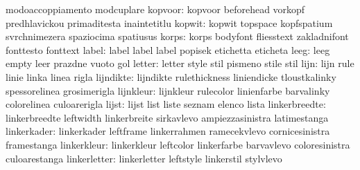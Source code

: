                            modoaccoppiamento         modcuplare
                  kopvoor: kopvoor                   beforehead
                           vorkopf                   predhlavickou
                           primaditesta              inaintetitlu
                   kopwit: kopwit                    topspace
                           kopfspatium               svrchnimezera
                           spaziocima                spatiusus
                    korps: korps                     bodyfont
                           fliesstext                zakladnifont
                           fonttesto                 fonttext
                    label: label                     label
                           label                     popisek
                           etichetta                 eticheta
                     leeg: leeg                      empty
                           leer                      prazdne
                           vuoto                     gol
                   letter: letter                    style
                           stil                      pismeno
                           stile                     stil
                     lijn: lijn                      rule
                           linie                     linka
                           linea                     rigla
                lijndikte: lijndikte                 rulethickness
                           liniendicke               tloustkalinky
                           spessorelinea             grosimerigla
                lijnkleur: lijnkleur                 rulecolor
                           linienfarbe               barvalinky
                           colorelinea               culoarerigla
                    lijst: lijst                     list
                           liste                     seznam
                           elenco                    lista
            linkerbreedte: linkerbreedte             leftwidth
                           linkerbreite              sirkavlevo
                           ampiezzasinistra          latimestanga
              linkerkader: linkerkader               leftframe
                           linkerrahmen              ramecekvlevo
                           cornicesinistra           framestanga
              linkerkleur: linkerkleur               leftcolor
                           linkerfarbe               barvavlevo
                           coloresinistra            culoarestanga
             linkerletter: linkerletter              leftstyle
                           linkerstil                stylvlevo
